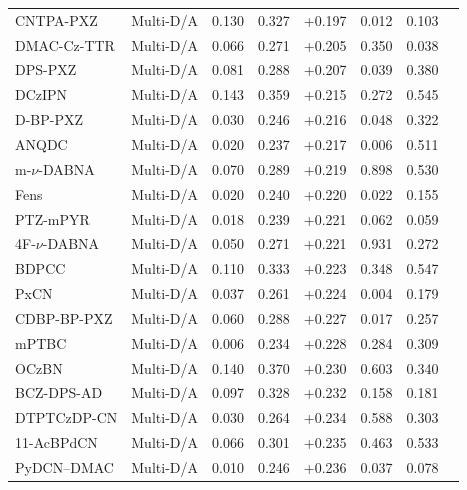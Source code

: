 \begin{longtable}{llcccccc}
CNTPA-PXZ & Multi-D/A & 0.130 & 0.327 & +0.197 & 0.012 & 0.103 & \cite{doi101016jdyepig201810076} \\
DMAC-Cz-TTR & Multi-D/A & 0.066 & 0.271 & +0.205 & 0.350 & 0.038 & \cite{doi101016jorgel2021106312} \\
DPS-PXZ & Multi-D/A & 0.081 & 0.288 & +0.207 & 0.039 & 0.380 & \cite{doi101039C9TC02032B} \\
DCzIPN & Multi-D/A & 0.143 & 0.359 & +0.215 & 0.272 & 0.545 & \cite{doi101016jcej2021128574} \\
D-BP-PXZ & Multi-D/A & 0.030 & 0.246 & +0.216 & 0.048 & 0.322 & \cite{doi101016jdyepig2023111104} \\
ANQDC & Multi-D/A & 0.020 & 0.237 & +0.217 & 0.006 & 0.511 & \cite{doi101016jcej2020126663} \\
m-$\nu$-DABNA & Multi-D/A & 0.070 & 0.289 & +0.219 & 0.898 & 0.530 & \cite{doi101016jcej2021134381} \\
Fens & Multi-D/A & 0.020 & 0.240 & +0.220 & 0.022 & 0.155 & \cite{doi101016jcclet202007041} \\
PTZ-mPYR & Multi-D/A & 0.018 & 0.239 & +0.221 & 0.062 & 0.059 & \cite{doi101039C9CP05907E} \\
4F-$\nu$-DABNA & Multi-D/A & 0.050 & 0.271 & +0.221 & 0.931 & 0.272 & \cite{doi101016jcej2021134381} \\
BDPCC & Multi-D/A & 0.110 & 0.333 & +0.223 & 0.348 & 0.547 & \cite{doi101039D1TC05696D} \\
PxCN & Multi-D/A & 0.037 & 0.261 & +0.224 & 0.004 & 0.179 & \cite{doi101016jdyepig2019107775} \\
CDBP-BP-PXZ & Multi-D/A & 0.060 & 0.288 & +0.227 & 0.017 & 0.257 & \cite{doi101039D1QM01625C} \\
mPTBC & Multi-D/A & 0.006 & 0.234 & +0.228 & 0.284 & 0.309 & \cite{doi101016jdyepig201704024} \\
OCzBN & Multi-D/A & 0.140 & 0.370 & +0.230 & 0.603 & 0.340 & \cite{doi101039C8SC05456H} \\
BCZ-DPS-AD & Multi-D/A & 0.097 & 0.328 & +0.232 & 0.158 & 0.181 & \cite{doi101016jcej2022138957} \\
DTPTCzDP-CN & Multi-D/A & 0.030 & 0.264 & +0.234 & 0.588 & 0.303 & \cite{doi101016jdyepig2022110430} \\
11-AcBPdCN & Multi-D/A & 0.066 & 0.301 & +0.235 & 0.463 & 0.533 & \cite{doi101016jcej2021134216} \\
PyDCN--DMAC & Multi-D/A & 0.010 & 0.246 & +0.236 & 0.037 & 0.078 & \cite{doi101039D1QM01303C} \\

\end{longtable}
